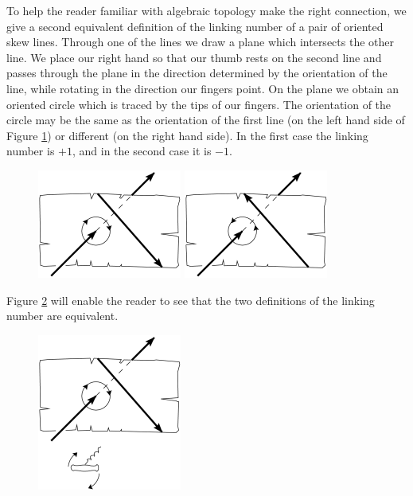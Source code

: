 \documentclass{article}
\begin{document}
To help the reader familiar with algebraic topology make the right connection,
we give a second equivalent definition of the linking number of a pair of
oriented skew lines. Through one of the lines we draw a plane which intersects
the other line. We place our right hand so that our thumb rests on the second
line and passes through the plane in the direction determined by the orientation
of the line, while rotating in the direction our fingers point. On the plane we
obtain an oriented circle which is traced by the tips of our fingers. The
orientation of the circle may be the same as the orientation of the first line
(on the left hand side of Figure \ref{f6}) or different (on the right hand
side). In the first case 
the linking number
is $+1$, and in the second case it is $-1$.
\begin{figure}
{\includegraphics{imagesSkewlines/x6.png}}
{\includegraphics{imagesSkewlines/x7.png}}
\caption{}
\label{f6}
\end{figure}

 Figure \ref{f8} will 
enable the reader to
see that the two definitions of the linking number are equivalent.

\begin{figure}
{\includegraphics{imagesSkewlines/x8.png}}
\caption{}
\label{f8}
\end{figure}
\end{document}

